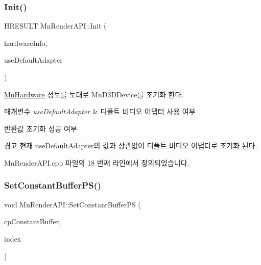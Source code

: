 \mbox{\label{class_m_n_l_1_1_mn_render_a_p_i_aef2f0aff53fac021b1c0b3e762d828ab}} 
\subsubsection{\texorpdfstring{Init()}{Init()}}
{\footnotesize\ttfamily H\+R\+E\+S\+U\+LT Mn\+Render\+A\+P\+I\+::\+Init (\begin{DoxyParamCaption}\item[{const \hyperlink{class_m_n_l_1_1_mn_hardware}{Mn\+Hardware} \&}]{hardware\+Info,  }\item[{bool}]{use\+Default\+Adapter }\end{DoxyParamCaption})}



\hyperlink{class_m_n_l_1_1_mn_hardware}{Mn\+Hardware} 정보를 토대로 Mn\+D3\+D\+Device를 초기화 한다. 


\begin{DoxyParams}{매개변수}
{\em use\+Default\+Adapter} & 디폴트 비디오 어댑터 사용 여부 \\
\hline
\end{DoxyParams}
\begin{DoxyReturn}{반환값}
초기화 성공 여부 
\end{DoxyReturn}
\begin{DoxyWarning}{경고}
현재 use\+Default\+Adapter의 값과 상관없이 디폴트 비디오 어댑터로 초기화 된다. 
\end{DoxyWarning}


Mn\+Render\+A\+P\+I.\+cpp 파일의 18 번째 라인에서 정의되었습니다.

\mbox{\label{class_m_n_l_1_1_mn_render_a_p_i_acbefa74f1c90c96711515e9dec3e711f}} 
\subsubsection{\texorpdfstring{Set\+Constant\+Buffer\+P\+S()}{SetConstantBufferPS()}}
{\footnotesize\ttfamily void Mn\+Render\+A\+P\+I\+::\+Set\+Constant\+Buffer\+PS (\begin{DoxyParamCaption}\item[{const \hyperlink{namespace_m_n_l_aab9c90a8c27ac6410a9cc7cd89efeef1}{C\+P\+D3\+D\+Buffer} \&}]{cp\+Constant\+Buffer,  }\item[{U\+I\+NT}]{index }\end{DoxyParamCaption})}



